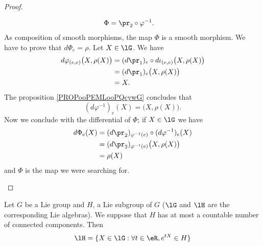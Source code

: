 \begin{proof}
\begin{subproof}
\begin{equation}
\begin{aligned}
				\Phi         & =\pr_2\circ \varphi^{-1}.
			\end{aligned}
		\end{equation}
		As composition of smooth morphisms, the map \( \Phi\) is a smooth morphism. We have to prove that \( d\Phi_e=\rho\).
		Let \( X\in\lG\). We have
		\begin{subequations}
			\begin{align}
				d\varphi_{(e,e)}\big( X,\rho(X) \big) & =(d\pr_1)_e\circ d\iota_{(e,e)}\big( X,\rho(X) \big) \\
				                                      & =(d\pr_1)_e\big( X,\rho(X) \big)                     \\
				                                      & =X.
			\end{align}
		\end{subequations}
		The proposition \ref{PROPooPEMLooPQcywG} concludes that
		\begin{equation}
			(d\varphi^{-1})_e(X)=\big( X,\rho(X) \big).
		\end{equation}
		\spitem[Conclusion]
		Now we conclude with the differential of \( \Phi\); if \( X\in\lG\) we have
		\begin{subequations}
			\begin{align}
				d\Phi_e(X) & =(d\pr_2)_{\varphi^{-1}(e)}\circ (d\varphi^{-1})_e(X) \\
				           & =(d\pr_2)_{\varphi^{-1}(e)}\big( X,\rho(X) \big)      \\
				           & =\rho(X)
			\end{align}
		\end{subequations}
		and \( \Phi\) is the map we were searching for.
	\end{subproof}
\end{proof}


\begin{proposition}     \label{PROPooCRKMooIIbKUM}
	Let $G$ be a Lie group and $H$, a Lie subgroup of $G$ ($\lG$ and $\lH$ are the corresponding Lie algebras). We suppose that $H$ has at most a countable number of connected components. Then
	\begin{equation}
		\lH=\{ X\in\lG:\forall t\in\eR,e^{tX}\in H \}
	\end{equation}
\end{proposition}


